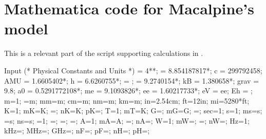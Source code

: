 \chapter{Mathematica code for Macalpine's model}
\label{chapter:macalpine_code}
This is a relevant part of the script supporting calculations in \cite{Leupold2015}.
\begin{mmaCell}[moredefined={c, AMU, h, kB, grav, a0, me, ee, eV, Eh, m, mm, cm, nm, km, in, ft, mi, mK, nK, pK, T, mT, G, mG, sec, s, ms, ns, A, mA, nA, W, mW, nW, Hz, kHz, MHz, GHz, nF, pF, nH, pH}]{Input}
(* Physical Constants and Units *)
 = 4*\mmaDef{\(\pi\)}*;
 = 8.854187817*;
c = 299792458;
AMU = 1.6605402*;
h = 6.6260755*;
\mmaDef{\(\hbar\)} = ;
 = 9.2740154*;
kB = 1.380658*;
grav = 9.8;
a0 = 0.5291772108*;
me = 9.1093826*;
ee = 1.60217733*; eV = ee;
Eh = ;
m=1; =m; mm=m; cm=m; nm=m; km=m;
in=2.54cm; ft=12in; mi=5280*ft;
K=1; mK=K; =; nK=K; pK=;
T=1; mT=K; G=; mG=G; =;
sec=1; s=1; ms=s; =s; ns=s;
\mmaDef{\(\Omega\)}=1; =; =; =;
A=1; mA=A; =; nA=;
W=1; mW=; =; nW=;
Hz=1; kHz=; MHz=; GHz=;
nF=; pF=;
nH=; pH=;
\end{mmaCell}


